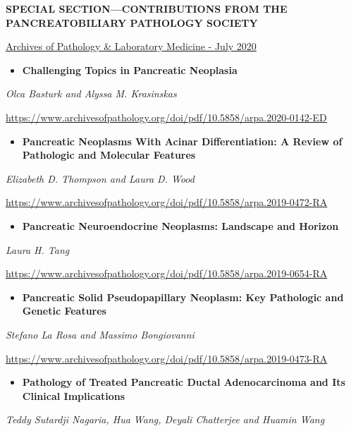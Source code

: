 \documentclass[
]{article}
\providecommand{\tightlist}{%
  \setlength{\itemsep}{0pt}\setlength{\parskip}{0pt}}
\begin{document}
\textbf{SPECIAL SECTION---CONTRIBUTIONS FROM THE PANCREATOBILIARY
PATHOLOGY SOCIETY}

\href{https://www.archivesofpathology.org/toc/arpa/144/7}{Archives of
Pathology \& Laboratory Medicine - July 2020}

\begin{itemize}
\tightlist
\item
  \textbf{Challenging Topics in Pancreatic Neoplasia }
\end{itemize}

\emph{Olca Basturk and Alyssa M. Krasinskas}

\url{https://www.archivesofpathology.org/doi/pdf/10.5858/arpa.2020-0142-ED}

\begin{itemize}
\tightlist
\item
  \textbf{Pancreatic Neoplasms With Acinar Differentiation: A Review of
  Pathologic and Molecular Features }
\end{itemize}

\emph{Elizabeth D. Thompson and Laura D. Wood}

\url{https://www.archivesofpathology.org/doi/pdf/10.5858/arpa.2019-0472-RA}

\begin{itemize}
\tightlist
\item
  \textbf{Pancreatic Neuroendocrine Neoplasms: Landscape and Horizon }
\end{itemize}

\emph{Laura H. Tang}

\url{https://www.archivesofpathology.org/doi/pdf/10.5858/arpa.2019-0654-RA}

\begin{itemize}
\tightlist
\item
  \textbf{Pancreatic Solid Pseudopapillary Neoplasm: Key Pathologic and
  Genetic Features }
\end{itemize}

\emph{Stefano La Rosa and Massimo Bongiovanni}

\url{https://www.archivesofpathology.org/doi/pdf/10.5858/arpa.2019-0473-RA}

\begin{itemize}
\tightlist
\item
  \textbf{Pathology of Treated Pancreatic Ductal Adenocarcinoma and Its
  Clinical Implications }
\end{itemize}

\emph{Teddy Sutardji Nagaria, Hua Wang, Deyali Chatterjee and Huamin
Wang}
\end{document}
